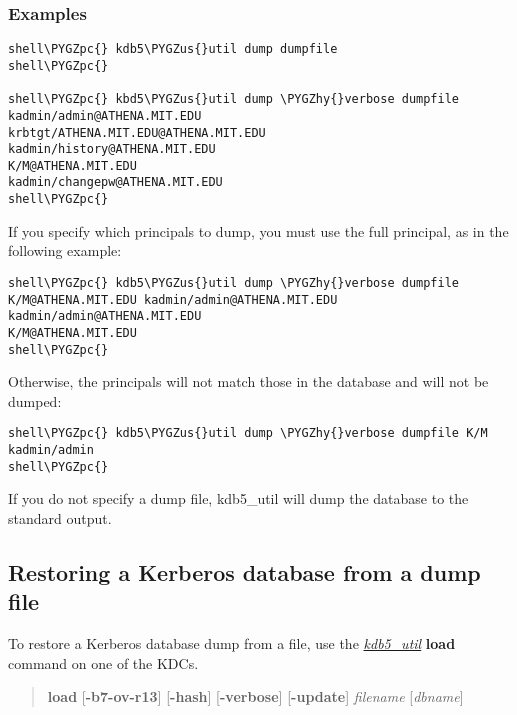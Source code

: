 \documentclass[letterpaper,10pt,english]{sphinxmanual}
\def\PYGZus{\char`\_}
\def\PYGZpc{\char`\%}
\def\PYGZhy{\char`\-}
\begin{document}
\subsubsection{Examples}
\label{admin/database:id3}
\begin{Verbatim}[commandchars=\\\{\}]
shell\PYGZpc{} kdb5\PYGZus{}util dump dumpfile
shell\PYGZpc{}

shell\PYGZpc{} kbd5\PYGZus{}util dump \PYGZhy{}verbose dumpfile
kadmin/admin@ATHENA.MIT.EDU
krbtgt/ATHENA.MIT.EDU@ATHENA.MIT.EDU
kadmin/history@ATHENA.MIT.EDU
K/M@ATHENA.MIT.EDU
kadmin/changepw@ATHENA.MIT.EDU
shell\PYGZpc{}
\end{Verbatim}

If you specify which principals to dump, you must use the full
principal, as in the following example:

\begin{Verbatim}[commandchars=\\\{\}]
shell\PYGZpc{} kdb5\PYGZus{}util dump \PYGZhy{}verbose dumpfile K/M@ATHENA.MIT.EDU kadmin/admin@ATHENA.MIT.EDU
kadmin/admin@ATHENA.MIT.EDU
K/M@ATHENA.MIT.EDU
shell\PYGZpc{}
\end{Verbatim}

Otherwise, the principals will not match those in the database and
will not be dumped:

\begin{Verbatim}[commandchars=\\\{\}]
shell\PYGZpc{} kdb5\PYGZus{}util dump \PYGZhy{}verbose dumpfile K/M kadmin/admin
shell\PYGZpc{}
\end{Verbatim}

If you do not specify a dump file, kdb5\_util will dump the database to
the standard output.


\subsection{Restoring a Kerberos database from a dump file}
\label{admin/database:restore-from-dump}\label{admin/database:restoring-a-kerberos-database-from-a-dump-file}
To restore a Kerberos database dump from a file, use the
{\hyperref[admin/admin_commands/kdb5_util:kdb5-util-8]{\emph{kdb5\_util}}} \textbf{load} command on one of the KDCs.
\begin{quote}

\textbf{load} {[}\textbf{-b7}\textbar{}\textbf{-ov}\textbar{}\textbf{-r13}{]} {[}\textbf{-hash}{]}
{[}\textbf{-verbose}{]} {[}\textbf{-update}{]} \emph{filename} {[}\emph{dbname}{]}
\end{quote}
\end{document}

